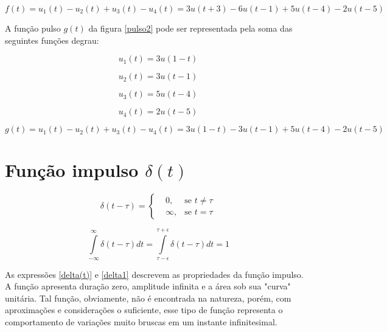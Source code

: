 \documentclass[12pt,fleqn]{book} %
\begin{document}
\begin{equation}
f(t)=u_1 (t)-u_2 (t)+u_3 (t)-u_4 (t) = 3u(t+3)-6u(t-1)+5u(t-4)-2u(t-5)
\end{equation}
   

A função pulso $g(t)$ da figura \ref{pulso2} pode ser representada pela soma das seguintes funções degrau:

\begin{equation}
u_1 (t)=3u(1-t)
\end{equation}

\begin{equation}
u_2 (t)=3u(t-1)
\end{equation}

\begin{equation}
u_3 (t)=5u(t-4)
\end{equation}

\begin{equation}
u_4 (t)=2u(t-5)
\end{equation}

\begin{equation}
g(t)=u_1 (t)-u_2 (t)+u_3 (t)-u_4 (t) = 3u(1-t)-3u(t-1)+5u(t-4)-2u(t-5)
\end{equation}
   
    \section{Função impulso {$\delta (t)$}}
    
\begin{equation}\label{delta(t)}
\delta(t-\tau) =\left\{\begin{aligned}  & 
        0,&\text{se }t\neq \tau\\&       
        \infty ,&\text{se }t=\tau
    \end{aligned}\right.
\end{equation}

\begin{equation}\label{delta1}
\int\limits_{-\infty}^{\infty} \delta(t-\tau)dt = \int\limits_{\tau - \epsilon}^{\tau+\epsilon} \delta(t-\tau)dt = 1
\end{equation}

As expressões \ref{delta(t)} e \ref{delta1} descrevem as propriedades da função impulso. A função apresenta duração zero, amplitude infinita e a área sob sua "curva" unitária. Tal função, obviamente, não é encontrada na natureza, porém, com aproximações e considerações o suficiente, esse tipo de função representa o comportamento de variações muito bruscas em um instante infinitesimal.
\end{document}
